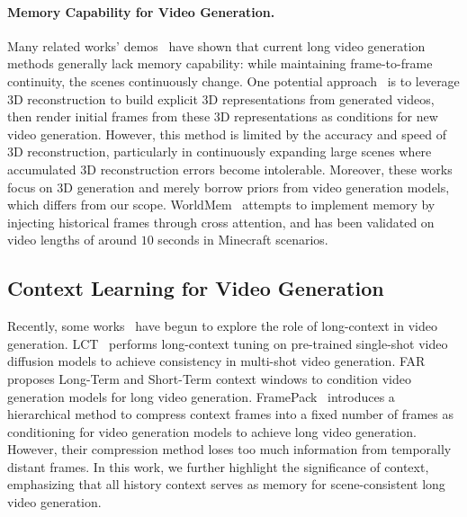 \paragraph{Memory Capability for Video Generation.} Many related works' demos~\cite{gamengine,oasis,dfot,wham} have shown that current long video generation methods generally lack memory capability: while maintaining frame-to-frame continuity, the scenes continuously change. One potential approach~\cite{wonderjourney,viewcrafter,see3d,gen3c} is to leverage 3D reconstruction to build explicit 3D representations from generated videos, then render initial frames from these 3D representations as conditions for new video generation. However, this method is limited by the accuracy and speed of 3D reconstruction, particularly in continuously expanding large scenes where accumulated 3D reconstruction errors become intolerable. Moreover, these works focus on 3D generation and merely borrow priors from video generation models, which differs from our scope. WorldMem~\cite{worldmem} attempts to implement memory by injecting historical frames through cross attention, and has been validated on video lengths of around $10$ seconds in Minecraft scenarios.


\subsection{Context Learning for Video Generation}
Recently, some works~\cite{lct,far,framepack} have begun to explore the role of long-context in video generation. LCT~\cite{lct} performs long-context tuning on pre-trained single-shot video diffusion models to achieve consistency in multi-shot video generation. FAR~\cite{far} proposes Long-Term and Short-Term context windows to condition video generation models for long video generation. FramePack~\cite{framepack} introduces a hierarchical method to compress context frames into a fixed number of frames as conditioning for video generation models to achieve long video generation. However, their compression method loses too much information from temporally distant frames. In this work, we further highlight the significance of context, emphasizing that all history context serves as memory for scene-consistent long video generation.



